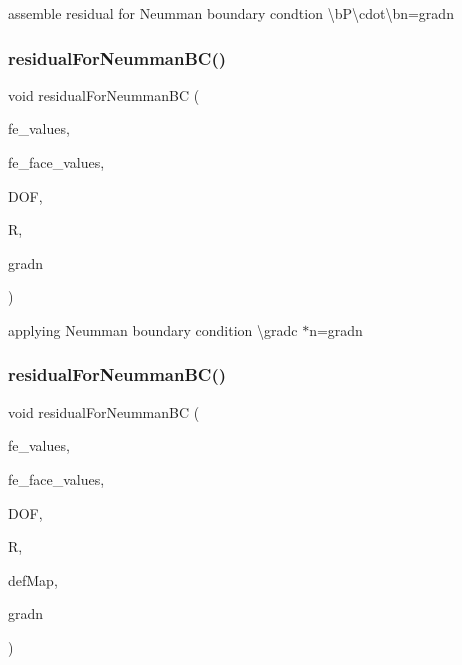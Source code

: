 assemble residual for Neumman boundary condtion \textbackslash{}bP\textbackslash{}cdot\textbackslash{}bn=gradn \mbox{\label{class_residual_ad0e81fca1fe14909b80e709c1e93e393}} 
\subsubsection{\texorpdfstring{residualForNeummanBC()}{residualForNeummanBC()}\hspace{0.1cm}{\footnotesize\ttfamily [2/4]}}
{\footnotesize\ttfamily void residual\+For\+Neumman\+BC (\begin{DoxyParamCaption}\item[{const F\+E\+Values$<$ dim $>$ \&}]{fe\+\_\+values,  }\item[{const F\+E\+Face\+Values$<$ dim $>$ \&}]{fe\+\_\+face\+\_\+values,  }\item[{unsigned int}]{D\+OF,  }\item[{dealii\+::\+Table$<$ 1, T $>$ \&}]{R,  }\item[{dealii\+::\+Table$<$ 1, T $>$ \&}]{gradn }\end{DoxyParamCaption})}

applying Neumman boundary condition \textbackslash{}gradc $\ast$n=gradn \mbox{\label{class_residual_af2aedfc68848cd35cac392aad840db05}} 
\subsubsection{\texorpdfstring{residualForNeummanBC()}{residualForNeummanBC()}\hspace{0.1cm}{\footnotesize\ttfamily [3/4]}}
{\footnotesize\ttfamily void residual\+For\+Neumman\+BC (\begin{DoxyParamCaption}\item[{const F\+E\+Values$<$ dim $>$ \&}]{fe\+\_\+values,  }\item[{const F\+E\+Face\+Values$<$ dim $>$ \&}]{fe\+\_\+face\+\_\+values,  }\item[{unsigned int}]{D\+OF,  }\item[{dealii\+::\+Table$<$ 1, T $>$ \&}]{R,  }\item[{\mbox{\hyperlink{structdeformation_map}{deformation\+Map}}$<$ T, dim $>$ \&}]{def\+Map,  }\item[{dealii\+::\+Table$<$ 1, T $>$ \&}]{gradn }\end{DoxyParamCaption})}

